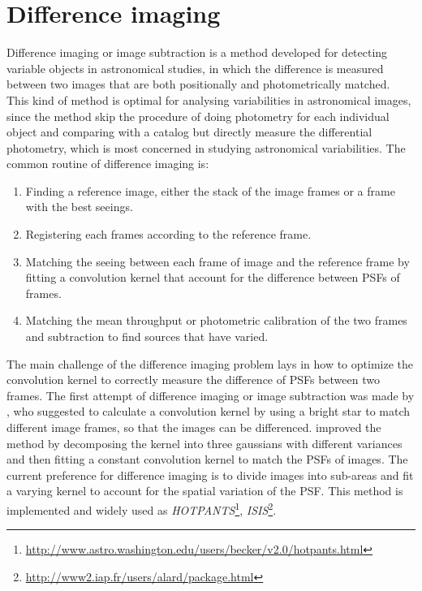 \documentclass[12pt, preprint]{aastex}
\newcommand{\project}[1]{\textsl{#1}}
\begin{document}
\section{Difference imaging}
Difference imaging or image subtraction is a method developed for detecting variable objects in astronomical studies, in which the difference is measured between two images that are both positionally and photometrically matched. This kind of method is optimal for analysing variabilities in astronomical images, since the method skip the procedure of doing photometry for each individual object and comparing with a catalog but directly measure the differential photometry, which is most concerned in studying astronomical variabilities.
The common routine of difference imaging is:
\begin{enumerate}
\item
Finding a reference image, either the stack of the image frames or a frame with the best seeings.
\item
Registering each frames according to the reference frame.
\item
Matching the seeing between each frame of image and the reference frame by fitting a convolution kernel that account for the difference between PSFs of frames.
\item
Matching the mean throughput or photometric calibration of the two frames and subtraction to find sources that have varied.
\end{enumerate}
The main challenge of the difference imaging problem lays in how to optimize the convolution kernel to correctly measure the difference of PSFs between two frames.
The first attempt of difference imaging or image subtraction was made by \cite{imagesub1}, who suggested to calculate a convolution kernel by using a bright star to match different image frames, so that the images can be differenced. 
\cite{alard} improved the method by decomposing the kernel into three gaussians with different variances and then fitting a constant convolution kernel to match the PSFs of images.
The current preference for difference imaging \citep{varyingkernel} is to divide images into sub-areas and fit a varying kernel to account for the spatial variation of the PSF. This method is implemented and widely used as \project{HOTPANTS}\footnote{\url{http://www.astro.washington.edu/users/becker/v2.0/hotpants.html}}, \project{ISIS}\footnote{\url{http://www2.iap.fr/users/alard/package.html}}.
\end{document}

